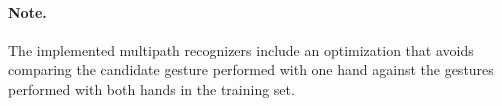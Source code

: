\paragraph{Note.}
The implemented multipath recognizers include an optimization that avoids comparing the candidate gesture performed with one hand against the gestures performed with both hands in the training set.


